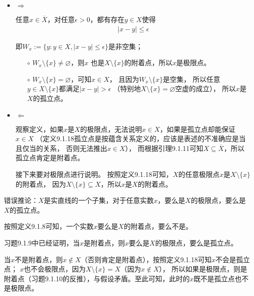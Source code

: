 \documentclass{article}
\begin{document}
\begin{itemize}
      \item $\Rightarrow$

            任意$x \in \overline{X}$，对任意$\epsilon > 0$，都有存在$y \in X$使得
            \begin{align*}
                  |x - y| \leq \epsilon
            \end{align*}

            即$W_x :=\{y: y \in X, |x-y| \leq \epsilon \}$是非空集；

            \begin{itemize}
                  \item[$\circ$] $W_x \setminus \{x\} \neq \varnothing$，则$x$
                        也是$X \setminus \{x\}$的附着点，所以$x$是极限点。
                  \item[$\circ$] $W_x \setminus \{x\} = \varnothing$，可知$x \in X$，
                        且因为$W_x \setminus \{x\}$是空集，
                        所以任意$y \in X \setminus \{x\}$都满足$|x-y| > \epsilon$
                        （特别地$X \setminus \{x\} = \varnothing$空虚的成立），
                        所以$x$是$X$的孤立点。
            \end{itemize}
      \item $\Leftarrow$

            观察定义，如果$x$是$X$的极限点，无法说明$x \in X$，如果是孤立点却能保证$x \in X$
            （定义9.1.18孤立点是按蕴含关系定义的，应该是表述的不准确应是当且仅当的关系，
            否则无法推出$x \in X$），
            而根据引理9.1.11可知$X \subseteq \overline{X}$，所以孤立点肯定是附着点。

            接下来要对极限点进行说明。
            按照定义9.1.18可知，$X$的任意极限点$x$是$X \setminus \{x\}$的附着点，
            因为$X \setminus \{x\} \subseteq X$，所以$x$是$X$的附着点。
\end{itemize}


\begin{zremark}
      错误推论：$X$是实直线的一个子集，对于任意实数$x$，要么是$X$的极限点，要么是$X$的孤立点。

      按照定义9.1.8可知，一个实数$x$要么是$X$的附着点，要么不是。

      习题9.1.9中已经证明，当$x$是附着点，则$x$要么是$X$的极限点，要么是孤立点。

      当$x$不是附着点，则$x \notin X$（否则肯定是附着点），按照定义9.1.18可知$x$不会是孤立点；
      $x$也不会极限点，因为$X \setminus \{x\} = X$（因为$x \notin X$），
      所以如果是极限点，则是附着点（习题9.1.10的反推），与假设矛盾。至此可知，此时的$x$既不是孤立点也不是极限点。

\end{zremark}
\end{document}
